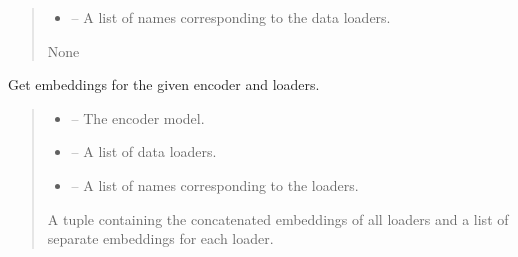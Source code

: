 \documentclass[letterpaper,10pt,english]{sphinxhowto}
\begin{document}
\begin{fulllineitems}
\begin{fulllineitems}
\begin{quote}
\begin{description}
\begin{itemize}
\item {} 
\sphinxAtStartPar
{} – A list of names corresponding to the data loaders.

\end{itemize}

\sphinxAtStartPar
None

\end{description}\end{quote}

\end{fulllineitems}


\begin{fulllineitems}
\label{\detokenize{top:id3}}
\pysigstartsignatures
{}
\pysigstopsignatures
\sphinxAtStartPar
Get embeddings for the given encoder and loaders.
\begin{quote}\begin{description}
\begin{itemize}
\item {} 
\sphinxAtStartPar
{} – The encoder model.

\item {} 
\sphinxAtStartPar
{} – A list of data loaders.

\item {} 
\sphinxAtStartPar
{} – A list of names corresponding to the loaders.

\end{itemize}

\sphinxAtStartPar
A tuple containing the concatenated embeddings of all loaders and a list of separate embeddings for each loader.

\end{description}\end{quote}

\end{fulllineitems}



\end{fulllineitems}
\end{document}
